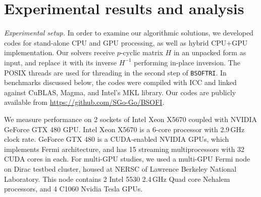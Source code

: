 \documentclass{llncs}
\newcommand{\MKL}{{\sc MKL}\xspace}
\newcommand{\Blas}{{\sc BLAS}\xspace}
\newcommand{\Lapack}{{\sc LAPack}\xspace}
\newcommand{\Cuda}{{\sc CUDA}\xspace}
\newcommand{\CuBlas}{{\sc Cu\Blas}\xspace}
\newcommand{\Magma}{{\sc Magma}\xspace}
\newcommand{\Bsoftri}{\texttt{BSOFTRI}\xspace}
\newcommand{\Gemm}{\texttt{DGEMM}\xspace}
\begin{document}
\section{Experimental results and analysis}
\label{sec:results}


\textit%
{Experimental setup.}
\label{sec:experimental_setup}
%
In order to examine our algorithmic solutions, 
we developed codes for 
stand-alone CPU and GPU processing, 
as well as hybrid CPU+GPU implementation.
Our solvers receive $p$-cyclic matrix $H$ in an unpacked form as input, 
and replace it with its inverse $H^{-1}$ 
performing in-place inversion. 
The POSIX threads are used for threading in the second step of \Bsoftri.
In benchmarks discussed below, the codes were compiled with ICC and linked 
against \CuBlas, \Magma, and %
Intel's MKL library.
Our codes are publicly available from
\url{https://github.com/SGo-Go/BSOFI}.

We measure performance on 
2 sockets of Intel Xeon X5670 
coupled with NVIDIA GeForce GTX 480 GPU.
Intel Xeon X5670 is a 6-core processor 
with 2.9\,GHz clock rate.
GeForce GTX 480 is a \Cuda-enabled NVIDIA GPUs, 
which implements Fermi architecture, 
and has 15 streaming multiprocessors with 32 \Cuda cores in each.
For multi-GPU studies,
we used a multi-GPU Fermi node on Dirac testbed cluster,
housed at NERSC of Lawrence Berkeley National Laboratory.
This node contains 2 Intel 5530 2.4\,GHz Quad core Nehalem processors, 
and 4 C1060 Nvidia Tesla GPUs.
\end{document}
